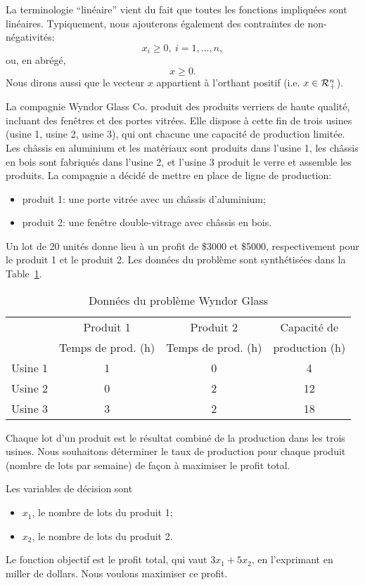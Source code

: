 La terminologie ``linéaire'' vient du fait que toutes les fonctions impliquées sont linéaires.
Typiquement, nous ajouterons également des contraintes de non-négativités:
\[
x_i \geq 0,\ i = 1,\ldots,n,
\]
ou, en abrégé,
\[
x \geq 0.
\]
Nous dirons aussi que le vecteur $x$ appartient à l'orthant positif (i.e. $x \in \mathcal{R}_+^n$).

\begin{example}
\label{ex:wyndor}
La compagnie Wyndor Glass Co. produit des produits verriers de haute qualité, incluant des fenêtres et des portes vitrées.
Elle dispose à cette fin de trois usines (usine 1, usine 2, usine 3), qui ont chacune une capacité de production limitée.
Les châssis en aluminium et les matériaux sont produits dans l'usine 1, les châssis en bois sont fabriqués dans l'usine 2, et l'usine 3 produit le verre et assemble les produits.
La compagnie a décidé de mettre en place de ligne de production:
\begin{itemize}
\item
produit 1: une porte vitrée avec un châssis d'aluminium;
\item
produit 2: une fenêtre double-vitrage avec châssis en bois.
\end{itemize}

Un lot de 20 unités donne lieu à un profit de \$3000 et \$5000, respectivement pour le produit 1 et le produit 2. Les données du problème sont synthétisées dans la Table~\ref{tab:wyndor}.
\begin{table}[htbp]
\begin{center}
\begin{tabular}{|c|c|c|c|}
\hline
& Produit 1 & Produit 2 & Capacité de \\
& Temps de prod. (h) & Temps de prod. (h)& production (h)\\
\hline
Usine 1 & 1 & 0 & 4 \\
\hline
Usine 2 & 0 & 2 & 12 \\
\hline
Usine 3 & 3 & 2 & 18 \\
\hline
\end{tabular}
\end{center}
\caption{Données du problème Wyndor Glass}
\label{tab:wyndor}
\end{table}
Chaque lot d'un produit est le résultat combiné de la production dans les trois usines.
Nous souhaitons déterminer le taux de production pour chaque produit (nombre de lots par semaine) de façon à maximiser le profit total.

Les variables de décision sont
\begin{itemize}
\item
$x_1$, le nombre de lots du produit 1;
\item
$x_2$, le nombre de lots du produit 2.
\end{itemize}
Le fonction objectif est le profit total, qui vaut $3x_1 +5x_2$, en l'exprimant en miller de dollars. Nous voulons maximiser ce profit.


\end{example}
